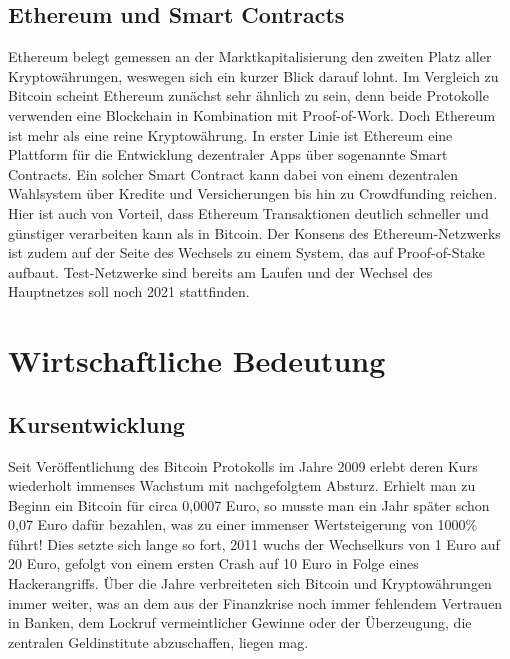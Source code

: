 \documentclass[12pt,oneside]{article}
\begin{document}
\subsection{Ethereum und Smart Contracts}

Ethereum belegt gemessen an der Marktkapitalisierung den zweiten Platz aller Kryptowährungen, weswegen sich ein kurzer Blick darauf lohnt. Im Vergleich zu Bitcoin scheint Ethereum zunächst sehr ähnlich zu sein, denn beide Protokolle verwenden eine Blockchain in Kombination mit Proof-of-Work. Doch Ethereum ist mehr als eine reine Kryptowährung. In erster Linie ist Ethereum eine Plattform für die Entwicklung dezentraler Apps über sogenannte Smart Contracts. Ein solcher Smart Contract kann dabei von einem dezentralen Wahlsystem über Kredite und Versicherungen bis hin zu Crowdfunding reichen. Hier ist auch von Vorteil, dass Ethereum Transaktionen deutlich schneller und günstiger verarbeiten kann als in Bitcoin. Der Konsens des Ethereum-Netzwerks ist zudem auf der Seite des Wechsels zu einem System, das auf Proof-of-Stake aufbaut. Test-Netzwerke sind bereits am Laufen und der Wechsel des Hauptnetzes soll noch 2021 stattfinden. \cite{soeteman2019} \cite{eth2021}

\section{Wirtschaftliche Bedeutung}



\subsection{Kursentwicklung}

Seit Veröffentlichung des Bitcoin Protokolls im Jahre 2009 erlebt deren Kurs wiederholt immenses Wachstum mit nachgefolgtem Absturz. Erhielt man zu Beginn ein Bitcoin für circa 0,0007 Euro, so musste man ein Jahr später schon 0,07 Euro dafür bezahlen, was zu einer immenser Wertsteigerung von 1000\% führt! Dies setzte sich lange so fort, 2011 wuchs der Wechselkurs von 1 Euro auf 20 Euro, gefolgt von einem ersten Crash auf 10 Euro in Folge eines Hackerangriffs. Über die Jahre verbreiteten sich Bitcoin und Kryptowährungen immer weiter, was an dem aus der Finanzkrise noch immer fehlendem Vertrauen in Banken, dem Lockruf vermeintlicher Gewinne oder der Überzeugung, die zentralen Geldinstitute abzuschaffen, liegen mag. 
\end{document}
